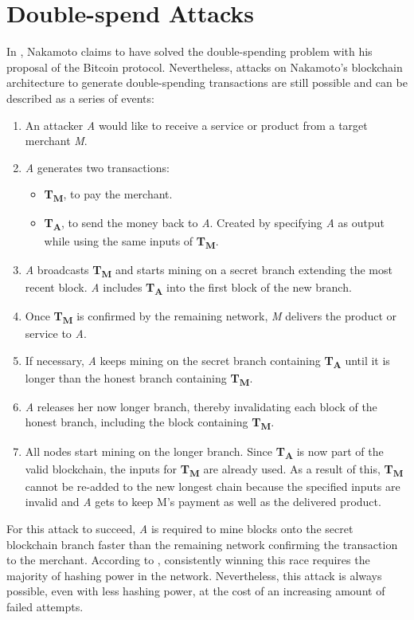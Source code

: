 \documentclass[a4paper,12pt,twoside]{report}
\begin{document}
\section{Double-spend Attacks} \label{dsa}
In \cite{nakamoto2008bitcoin}, Nakamoto claims to have solved the double-spending problem with his proposal of the Bitcoin protocol. Nevertheless, attacks on Nakamoto's blockchain architecture to generate double-spending transactions are still possible and can be described as a series of events:
\begin{enumerate}
\item An attacker \textit{A} would like to receive a service or product from a target merchant \textit{M}.
\item \textit{A} generates two transactions:
\begin{itemize}
\item \textbf{T\textsubscript{M}}, to pay the merchant.
\item \textbf{T\textsubscript{A}}, to send the money back to \textit{A}. Created by specifying \textit{A} as output while using the same inputs of \textbf{T\textsubscript{M}}.
\end{itemize}
\item \textit{A} broadcasts \textbf{T\textsubscript{M}} and starts mining on a secret branch extending the most recent block. \textit{A} includes \textbf{T\textsubscript{A}} into the first block of the new branch.
\item Once \textbf{T\textsubscript{M}} is confirmed by the remaining network, \textit{M} delivers the product or service to \textit{A}.
\item If necessary, \textit{A} keeps mining on the secret branch containing \textbf{T\textsubscript{A}} until it is longer than the honest branch containing \textbf{T\textsubscript{M}}.
\item \textit{A} releases her now longer branch, thereby invalidating each block of the honest branch, including the block containing \textbf{T\textsubscript{M}}.
\item All nodes start mining on the longer branch. Since \textbf{T\textsubscript{A}} is now part of the valid blockchain, the inputs for \textbf{T\textsubscript{M}} are already used. As a result of this, \textbf{T\textsubscript{M}} cannot be re-added to the new longest chain because the specified inputs are invalid and \textit{A} gets to keep M's payment as well as the delivered product.
\end{enumerate}
For this attack to succeed, \textit{A} is required to mine blocks onto the secret blockchain branch faster than the remaining network confirming the transaction to the merchant. According to \cite{nakamoto2008bitcoin}, consistently winning this race requires the majority of hashing power in the network. Nevertheless, this attack is always possible, even with less hashing power, at the cost of an increasing amount of failed attempts. \cite{HBDSA,DSAwithTime}
\end{document}
